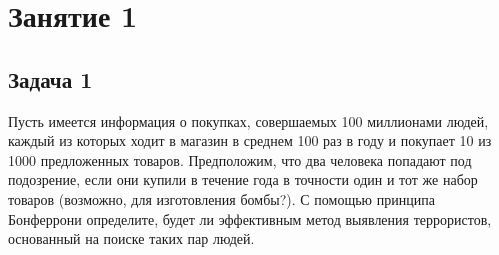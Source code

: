 \documentclass[12pt,a4paper]{article}
\author{Николай Анохин}
\begin{document}
\section*{Занятие 1}

\subsection*{Задача 1}

Пусть имеется информация о покупках, совершаемых 100 миллионами людей, каждый из которых ходит в магазин в среднем 100 раз в году и покупает 10 из 1000 предложенных товаров. Предположим, что два человека попадают под подозрение, если они купили в течение года в точности один и тот же набор товаров (возможно, для изготовления бомбы?). С помощью принципа Бонферрони определите, будет ли эффективным метод выявления террористов, основанный на поиске таких пар людей.
\end{document}
